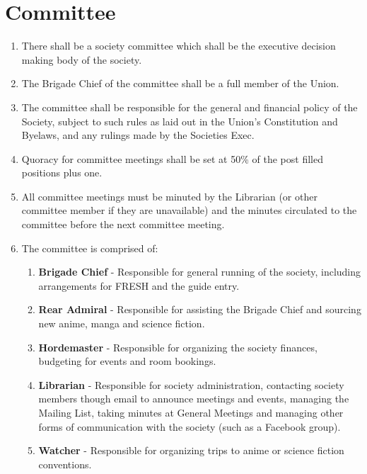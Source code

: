 \documentclass[a4paper,10pt]{article}
\begin{document}
\section{Committee}
\begin{enumerate}
  \item There shall be a society committee which shall be the executive decision making body of the society.
  \item The Brigade Chief of the committee shall be a full member of the Union.
  \item The committee shall be responsible for the general and financial policy of the Society, subject to such rules as laid out in the Union's Constitution and Byelaws, and any rulings made by the Societies Exec.
  \item Quoracy for committee meetings shall be set at 50\% of the post filled positions plus one.
  \item All committee meetings must be minuted by the Librarian (or other committee member if they are unavailable) and the minutes circulated to the committee before the next committee meeting.
  \item The committee is comprised of:
  \begin{enumerate}
    \item \textbf{Brigade Chief} - Responsible for general running of the society, including arrangements for FRESH and the guide entry.
    \item \textbf{Rear Admiral} - Responsible for assisting the Brigade Chief and sourcing new anime, manga and science fiction.
    \item \textbf{Hordemaster} - Responsible for organizing the society finances, budgeting for events and room bookings.
    \item \textbf{Librarian} - Responsible for society administration, contacting society members though email to announce meetings and events, managing the Mailing List, taking minutes at General Meetings and managing other forms of communication with the society (such as a Facebook group).
    \item \textbf{Watcher} - Responsible for organizing trips to anime or science fiction conventions.
  \end{enumerate}
\end{enumerate}
\end{document}
